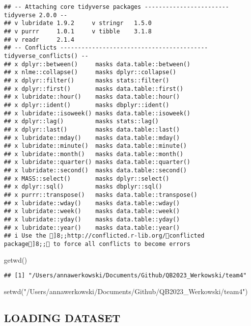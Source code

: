 \documentclass[
]{article}
\newenvironment{Shaded}{\begin{snugshade}}{\end{snugshade}}
\newcommand{\FunctionTok}[1]{\textcolor[rgb]{0.00,0.00,0.00}{#1}}
\newcommand{\NormalTok}[1]{#1}
\newcommand{\StringTok}[1]{\textcolor[rgb]{0.31,0.60,0.02}{#1}}
\begin{document}
\begin{verbatim}
## -- Attaching core tidyverse packages ------------------------ tidyverse 2.0.0 --
## v lubridate 1.9.2     v stringr   1.5.0
## v purrr     1.0.1     v tibble    3.1.8
## v readr     2.1.4     
## -- Conflicts ------------------------------------------ tidyverse_conflicts() --
## x dplyr::between()     masks data.table::between()
## x nlme::collapse()     masks dplyr::collapse()
## x dplyr::filter()      masks stats::filter()
## x dplyr::first()       masks data.table::first()
## x lubridate::hour()    masks data.table::hour()
## x dplyr::ident()       masks dbplyr::ident()
## x lubridate::isoweek() masks data.table::isoweek()
## x dplyr::lag()         masks stats::lag()
## x dplyr::last()        masks data.table::last()
## x lubridate::mday()    masks data.table::mday()
## x lubridate::minute()  masks data.table::minute()
## x lubridate::month()   masks data.table::month()
## x lubridate::quarter() masks data.table::quarter()
## x lubridate::second()  masks data.table::second()
## x MASS::select()       masks dplyr::select()
## x dplyr::sql()         masks dbplyr::sql()
## x purrr::transpose()   masks data.table::transpose()
## x lubridate::wday()    masks data.table::wday()
## x lubridate::week()    masks data.table::week()
## x lubridate::yday()    masks data.table::yday()
## x lubridate::year()    masks data.table::year()
## i Use the ]8;;http://conflicted.r-lib.org/conflicted package]8;; to force all conflicts to become errors
\end{verbatim}

\begin{Shaded}
\begin{Highlighting}[]
\FunctionTok{getwd}\NormalTok{()}
\end{Highlighting}
\end{Shaded}

\begin{verbatim}
## [1] "/Users/annawerkowski/Documents/Github/QB2023_Werkowski/team4"
\end{verbatim}

\begin{Shaded}
\begin{Highlighting}[]
\FunctionTok{setwd}\NormalTok{(}\StringTok{"/Users/annawerkowski/Documents/Github/QB2023\_Werkowski/team4"}\NormalTok{)}
\end{Highlighting}
\end{Shaded}

\hypertarget{loading-dataset}{%
\subsection{LOADING DATASET}\label{loading-dataset}}
\end{document}
